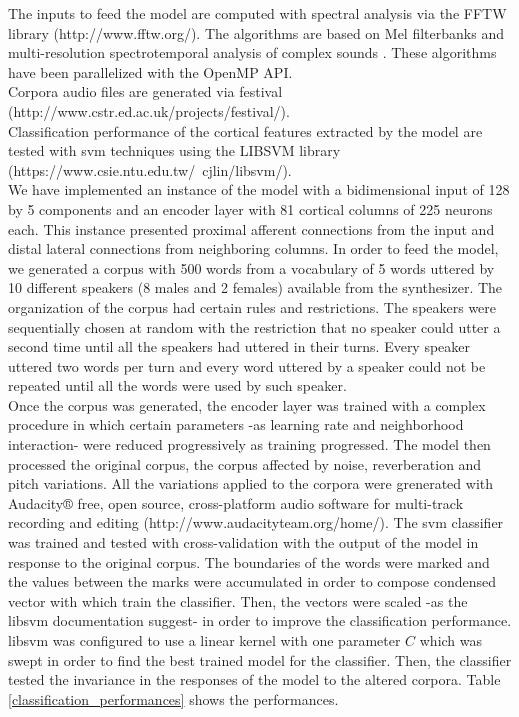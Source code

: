 \documentclass[11pt,a4paper]{article}
\begin{document}
The inputs to feed the model are computed
with spectral analysis via the FFTW library (http://www.fftw.org/).
The algorithms are based on 
Mel filterbanks and multi-resolution
spectrotemporal analysis of complex sounds \cite{taishih_2005}.
These algorithms have been parallelized with the OpenMP API. \\

Corpora audio files are generated via \gls{festival} \\ (http://www.cstr.ed.ac.uk/projects/festival/). \\

Classification performance of the cortical features extracted by the model are tested with
\gls{svm} techniques using the LIBSVM library (https://www.csie.ntu.edu.tw/~cjlin/libsvm/). \\

We have implemented an instance of the model with a bidimensional input
of 128 by 5 components and an encoder layer
with 81 cortical columns of 225 neurons each.
This instance presented proximal afferent connections
from the input and distal lateral connections from
neighboring columns.
In order to feed the model, we generated a corpus with 500 words from a vocabulary of
5 words uttered by 10 different speakers (8 males and 2 females) available from the synthesizer.
The organization of the corpus had certain rules and restrictions.
The speakers were sequentially chosen at random with the restriction that no speaker could
utter a second time until all the speakers had uttered in their turns.
Every speaker uttered two words per turn and every word uttered by a speaker
could not be repeated until all the words were used by such speaker. \\

Once the corpus was generated, the encoder layer was trained with a complex procedure
in which certain parameters -as learning rate and neighborhood interaction- were
reduced progressively as training progressed. 
The model then processed the original corpus, the corpus affected by noise,
reverberation and pitch variations.
All the variations applied to the corpora were grenerated with
Audacity® free, open source, cross-platform audio software for
multi-track recording and editing
(http://www.audacityteam.org/home/).
The \gls{svm} classifier was trained and tested with cross-validation
with the output of the model in response to the original corpus.
The boundaries of the words were marked and the values between the marks
were accumulated in order to compose condensed vector with which train
the classifier. Then, the vectors were scaled -as the \gls{libsvm} documentation suggest-
in order to improve the classification performance.
\gls{libsvm} was configured to use a linear kernel with one parameter $C$ which
was swept in order to find the best trained model for the classifier.
Then, the classifier tested the invariance in the responses of the model
to the altered corpora.
Table \ref{classification_performances} shows the performances. \\
\end{document}
